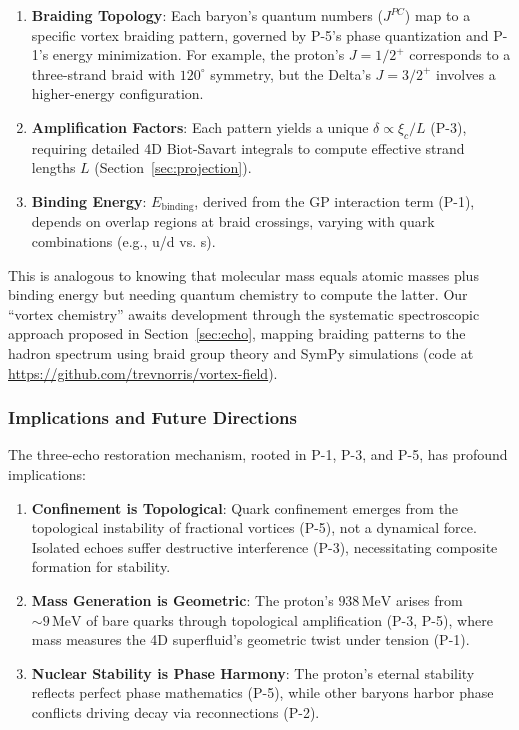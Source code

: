 \begin{enumerate}
\item \textbf{Braiding Topology}: Each baryon's quantum numbers ($J^{PC}$) map to a specific vortex braiding pattern, governed by P-5's phase quantization and P-1's energy minimization. For example, the proton's $J=1/2^+$ corresponds to a three-strand braid with $120^\circ$ symmetry, but the Delta's $J=3/2^+$ involves a higher-energy configuration.
\item \textbf{Amplification Factors}: Each pattern yields a unique $\delta \propto \xi_c/L$ (P-3), requiring detailed 4D Biot-Savart integrals to compute effective strand lengths $L$ (Section~\ref{sec:projection}).
\item \textbf{Binding Energy}: $E_{\text{binding}}$, derived from the GP interaction term (P-1), depends on overlap regions at braid crossings, varying with quark combinations (e.g., u/d vs. s).
\end{enumerate}

This is analogous to knowing that molecular mass equals atomic masses plus binding energy but needing quantum chemistry to compute the latter. Our ``vortex chemistry'' awaits development through the systematic spectroscopic approach proposed in Section~\ref{sec:echo}, mapping braiding patterns to the hadron spectrum using braid group theory and SymPy simulations (code at \url{https://github.com/trevnorris/vortex-field}).

\subsubsection{Implications and Future Directions}

The three-echo restoration mechanism, rooted in P-1, P-3, and P-5, has profound implications:

\begin{enumerate}
\item \textbf{Confinement is Topological}: Quark confinement emerges from the topological instability of fractional vortices (P-5), not a dynamical force. Isolated echoes suffer destructive interference (P-3), necessitating composite formation for stability.
\item \textbf{Mass Generation is Geometric}: The proton's $938 \, \text{MeV}$ arises from $\sim 9 \, \text{MeV}$ of bare quarks through topological amplification (P-3, P-5), where mass measures the 4D superfluid's geometric twist under tension (P-1).
\item \textbf{Nuclear Stability is Phase Harmony}: The proton's eternal stability reflects perfect phase mathematics (P-5), while other baryons harbor phase conflicts driving decay via reconnections (P-2).
\end{enumerate}


